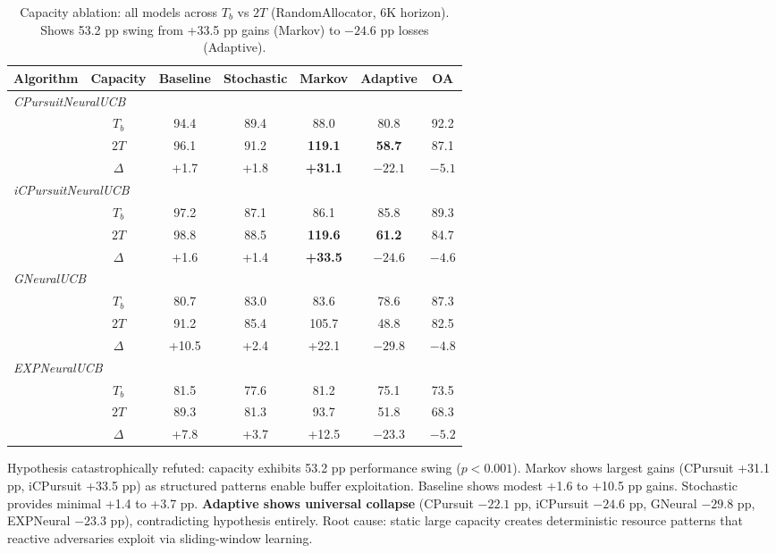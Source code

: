 \begin{table}[H]
\footnotesize
\centering
\caption{Capacity ablation: all models across $T_b$ vs $2T$ (RandomAllocator, 6K horizon). Shows 53.2 pp swing from +33.5 pp gains (Markov) to $-24.6$ pp losses (Adaptive).}
\begin{tabular}{lcccccc}
\toprule
\textbf{Algorithm} & \textbf{Capacity} & \textbf{Baseline} & \textbf{Stochastic} & \textbf{Markov} & \textbf{Adaptive} & \textbf{OA} \\
\midrule
\multicolumn{7}{l}{\textit{CPursuitNeuralUCB}} \\
 & $T_b$ & 94.4 & 89.4 & 88.0 & 80.8 & 92.2 \\
 & $2T$ & 96.1 & 91.2 & \textbf{119.1} & \textbf{58.7} & 87.1 \\
 & $\Delta$ & +1.7 & +1.8 & \textbf{+31.1} & \textbf{$-22.1$} & $-5.1$ \\
\midrule
\multicolumn{7}{l}{\textit{iCPursuitNeuralUCB}} \\
 & $T_b$ & 97.2 & 87.1 & 86.1 & 85.8 & 89.3 \\
 & $2T$ & 98.8 & 88.5 & \textbf{119.6} & \textbf{61.2} & 84.7 \\
 & $\Delta$ & +1.6 & +1.4 & \textbf{+33.5} & \textbf{$-24.6$} & $-4.6$ \\
\midrule
\multicolumn{7}{l}{\textit{GNeuralUCB}} \\
 & $T_b$ & 80.7 & 83.0 & 83.6 & 78.6 & 87.3 \\
 & $2T$ & 91.2 & 85.4 & 105.7 & 48.8 & 82.5 \\
 & $\Delta$ & +10.5 & +2.4 & +22.1 & $-29.8$ & $-4.8$ \\
\midrule
\multicolumn{7}{l}{\textit{EXPNeuralUCB}} \\
 & $T_b$ & 81.5 & 77.6 & 81.2 & 75.1 & 73.5 \\
 & $2T$ & 89.3 & 81.3 & 93.7 & 51.8 & 68.3 \\
 & $\Delta$ & +7.8 & +3.7 & +12.5 & $-23.3$ & $-5.2$ \\
\bottomrule
\end{tabular}
\label{tab:rq3b_capacity}
\end{table}

Hypothesis catastrophically refuted: capacity exhibits 53.2 pp performance swing ($p<0.001$). Markov shows largest gains (CPursuit +31.1 pp, iCPursuit +33.5 pp) as structured patterns enable buffer exploitation. Baseline shows modest +1.6 to +10.5 pp gains. Stochastic provides minimal +1.4 to +3.7 pp. \textbf{Adaptive shows universal collapse} (CPursuit $-22.1$ pp, iCPursuit $-24.6$ pp, GNeural $-29.8$ pp, EXPNeural $-23.3$ pp), contradicting hypothesis entirely. Root cause: static large capacity creates deterministic resource patterns that reactive adversaries exploit via sliding-window learning.

